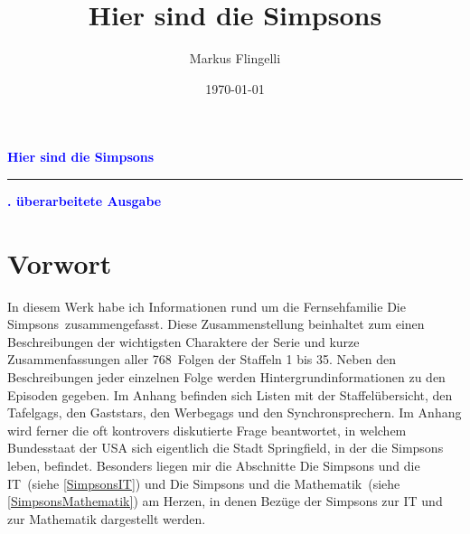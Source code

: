 \documentclass[pagesize,twoside,german]{scrbook}
\author{Markus Flingelli}
\date{\today}
\title{Hier sind die Simpsons}
\newcommand{\staffelAnzahl}{35}
\newcommand{\episodenAnzahl}{768}
\begin{document}
\setcounter{page}{1}

\def\datengerman{\def\today{\ifnum\day<10 0\fi\number\day.\ifnum\month<10 0\fi\number\month.\number\year}}

{}


\HTMLOutput{}
{
}

  
\HTMLOutput{
\maketitle
}
{
\vspace*{3ex}
\pagecolor{titleColor}\afterpage{\nopagecolor}
\vspace*{8cm}
\begin{flushleft}
  \Huge\textcolor{blue}{\textbf{\sffamily Hier sind die Simpsons}}\\
  \textcolor{blue}{\rule{\linewidth}{4pt}}
  \vspace{2ex}
  \huge\textcolor{blue}{\textbf{. überarbeitete Ausgabe}}
\end{flushleft}

\newpage
}

{}

\section*{Vorwort}
In diesem Werk habe ich Informationen rund um die Fernsehfamilie \glqq Die Simpsons\grqq\ zusammengefasst. Diese Zusammenstellung beinhaltet zum einen Beschreibungen der wichtigsten Charaktere der Serie und kurze Zusammenfassungen aller \episodenAnzahl\ Folgen der Staffeln 1 bis \staffelAnzahl . Neben den Beschreibungen jeder einzelnen Folge werden Hintergrundinformationen zu den Episoden gegeben. Im Anhang befinden sich Listen mit der Staffelübersicht, den Tafelgags, den Gaststars, den Werbegags und den Synchronsprechern. Im Anhang wird ferner die oft kontrovers diskutierte Frage beantwortet, in welchem Bundesstaat der USA sich eigentlich die Stadt Springfield, in der die Simpsons leben, befindet. Besonders liegen mir die Abschnitte \glqq Die Simpsons und die IT\grqq\ (siehe \ref{SimpsonsIT}) und \glqq Die Simpsons und die Mathematik\grqq\ (siehe \ref{SimpsonsMathematik}) am Herzen, in denen Bezüge der Simpsons zur IT und zur Mathematik dargestellt werden.
\end{document}
